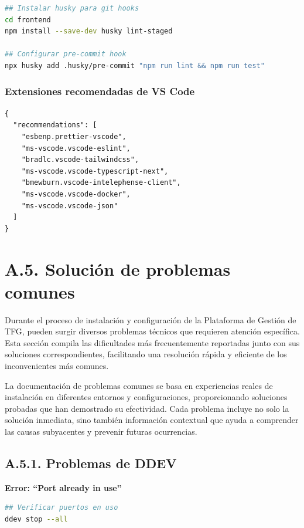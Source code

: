 \documentclass[12pt,a4paper,oneside]{report}
\begin{document}
{\begin{lstlisting}[language=bash]
## Instalar husky para git hooks
cd frontend
npm install --save-dev husky lint-staged

## Configurar pre-commit hook
npx husky add .husky/pre-commit "npm run lint && npm run test"
\end{lstlisting}

\subsubsection{Extensiones recomendadas de VS
Code}\label{extensiones-recomendadas-de-vs-code}

\begin{lstlisting}
{
  "recommendations": [
    "esbenp.prettier-vscode",
    "ms-vscode.vscode-eslint",
    "bradlc.vscode-tailwindcss",
    "ms-vscode.vscode-typescript-next",
    "bmewburn.vscode-intelephense-client",
    "ms-vscode.vscode-docker",
    "ms-vscode.vscode-json"
  ]
}
\end{lstlisting}

\section{A.5. Solución de problemas
comunes}\label{a.5.-soluciuxf3n-de-problemas-comunes}

Durante el proceso de instalación y configuración de la Plataforma de
Gestión de TFG, pueden surgir diversos problemas técnicos que requieren
atención específica. Esta sección compila las dificultades más
frecuentemente reportadas junto con sus soluciones correspondientes,
facilitando una resolución rápida y eficiente de los inconvenientes más
comunes.

La documentación de problemas comunes se basa en experiencias reales de
instalación en diferentes entornos y configuraciones, proporcionando
soluciones probadas que han demostrado su efectividad. Cada problema
incluye no solo la solución inmediata, sino también información
contextual que ayuda a comprender las causas subyacentes y prevenir
futuras ocurrencias.

\subsection{A.5.1. Problemas de DDEV}\label{a.5.1.-problemas-de-ddev}

\textbf{Error: ``Port already in use''}

\begin{lstlisting}[language=bash]
## Verificar puertos en uso
ddev stop --all


\end{lstlisting}}
\end{document}

